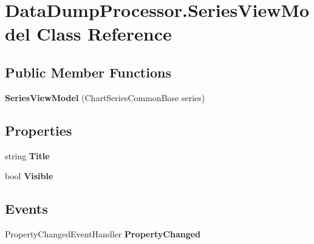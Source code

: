 \hypertarget{class_data_dump_processor_1_1_series_view_model}{\section{Data\-Dump\-Processor.\-Series\-View\-Model Class Reference}
\label{class_data_dump_processor_1_1_series_view_model}
}
\subsection*{Public Member Functions}
\begin{DoxyCompactItemize}
\item 
\hypertarget{class_data_dump_processor_1_1_series_view_model_a1d3bb3a371adce90e3be06fb2fcbc455}{{\bfseries Series\-View\-Model} (Chart\-Series\-Common\-Base series)}\label{class_data_dump_processor_1_1_series_view_model_a1d3bb3a371adce90e3be06fb2fcbc455}

\end{DoxyCompactItemize}
\subsection*{Properties}
\begin{DoxyCompactItemize}
\item 
\hypertarget{class_data_dump_processor_1_1_series_view_model_a064f5071a3bd0621f35ccb0cce26dfbf}{string {\bfseries Title}}\label{class_data_dump_processor_1_1_series_view_model_a064f5071a3bd0621f35ccb0cce26dfbf}

\item 
\hypertarget{class_data_dump_processor_1_1_series_view_model_a3897e7e5c7abb18db7d39632116ace8a}{bool {\bfseries Visible}}\label{class_data_dump_processor_1_1_series_view_model_a3897e7e5c7abb18db7d39632116ace8a}

\end{DoxyCompactItemize}
\subsection*{Events}
\begin{DoxyCompactItemize}
\item 
\hypertarget{class_data_dump_processor_1_1_series_view_model_a2e43d21e9f5f5790a38a1f3b187eac18}{Property\-Changed\-Event\-Handler {\bfseries Property\-Changed}}\label{class_data_dump_processor_1_1_series_view_model_a2e43d21e9f5f5790a38a1f3b187eac18}

\end{DoxyCompactItemize}
